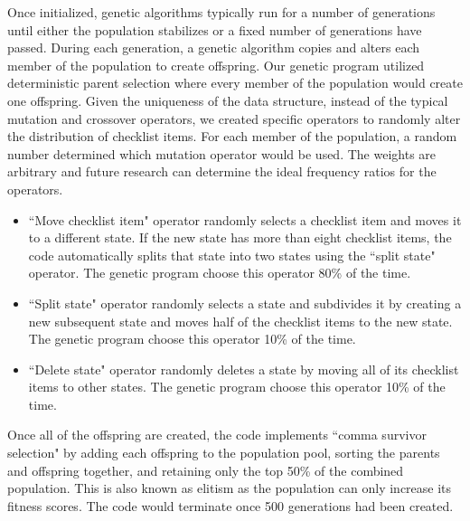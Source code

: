 \documentclass[preprint,12pt,3p]{elsarticle}
\begin{document}
Once initialized, genetic algorithms typically run for a number of generations until either the population stabilizes or a fixed number of generations have passed. During each generation, a genetic algorithm copies and alters each member of the population to create offspring. Our genetic program utilized deterministic parent selection where every member of the population would create one offspring. Given the uniqueness of the data structure, instead of the typical mutation and crossover operators, we created specific operators to randomly alter the distribution of checklist items. For each member of the population, a random number determined which mutation operator would be used. The weights are arbitrary and future research can determine the ideal frequency ratios for the operators.

\begin{itemize}
\item ``Move checklist item" operator randomly selects a checklist item and moves it to a different state. If the new state has more than eight checklist items, the code automatically splits that state into two states using the ``split state" operator. The genetic program choose this operator 80\% of the time.
\item ``Split state" operator randomly selects a state and subdivides it by creating a new subsequent state and moves half of the checklist items to the new state. The genetic program choose this operator 10\% of the time.
\item ``Delete state" operator randomly deletes a state by moving all of its checklist items to other states. The genetic program choose this operator 10\% of the time.
\end{itemize}

Once all of the offspring are created, the code implements ``comma survivor selection" by adding each offspring to the population pool, sorting the parents and offspring together, and retaining only the top 50\% of the combined population. This is also known as elitism as the population can only increase its fitness scores. The code would terminate once 500 generations had been created.
\end{document}
